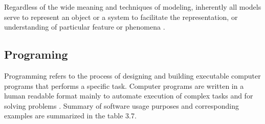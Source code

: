 Regardless of the wide meaning and techniques of modeling, inherently all models serve to represent an object or a system to facilitate the representation, or understanding of particular feature or phenomena \citep{enwiki:1058944086, enwiki:1051627717}.  


\subsection{Programing}
\label{sec:purpose:Types:Programing}
Programming refers to the process of designing and building executable computer programs that performs a specific task. Computer programs are written in a human readable format mainly to automate execution of complex tasks and for solving problems \citep{enwiki:1062649903}. Summary of software usage purposes and corresponding examples are summarized in the table 3.7.

